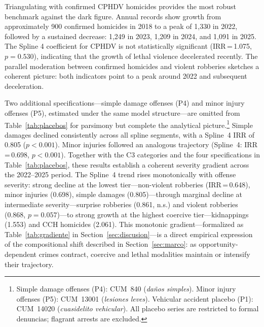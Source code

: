 \documentclass[pdflatex,sn-basic]{sn-jnl}
\begin{document}
Triangulating with confirmed CPHDV homicides provides the most robust benchmark against the dark figure. Annual records show growth from approximately 900 confirmed homicides in 2018 to a peak of 1,330 in 2022, followed by a sustained decrease: 1,249 in 2023, 1,209 in 2024, and 1,091 in 2025. The Spline 4 coefficient for CPHDV is not statistically significant (IRR\,=\,1.075, $p=0.530$), indicating that the growth of lethal violence decelerated recently. The parallel moderation between confirmed homicides and violent robberies sketches a coherent picture: both indicators point to a peak around 2022 and subsequent deceleration.

Two additional specifications---simple damage offenses (P4) and minor injury offenses (P5), estimated under the same model structure---are omitted from Table~\ref{tab:placebos} for parsimony but complete the analytical picture.\footnote{Simple damage offenses (P4): CUM~840 (\textit{da\~nos simples}). Minor injury offenses (P5): CUM~13001 (\textit{lesiones leves}). Vehicular accident placebo (P1): CUM~14020 (\textit{cuasidelito vehicular}). All placebo series are restricted to formal denuncias; flagrant arrests are excluded.} Simple damages declined consistently across all spline segments, with a Spline~4 IRR of 0.805 ($p<0.001$). Minor injuries followed an analogous trajectory (Spline~4: IRR\,=\,0.698, $p<0.001$). Together with the C3 categories and the four specifications in Table~\ref{tab:placebos}, these results establish a coherent severity gradient across the 2022--2025 period. The Spline~4 trend rises monotonically with offense severity: strong decline at the lowest tier---non-violent robberies (IRR\,=\,0.648), minor injuries (0.698), simple damages (0.805)---through marginal decline at intermediate severity---surprise robberies (0.861, n.s.) and violent robberies (0.868, $p=0.057$)---to strong growth at the highest coercive tier---kidnappings (1.553) and CCH homicides (2.061). This monotonic gradient---formalized as Table~\ref{tab:gradiente} in Section~\ref{sec:discusion}---is a direct empirical expression of the compositional shift described in Section~\ref{sec:marco}: as opportunity-dependent crimes contract, coercive and lethal modalities maintain or intensify their trajectory.
\end{document}
